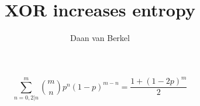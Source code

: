 \documentclass{article}
\title{XOR increases entropy}
\author{Daan van Berkel}
\begin{document}
  \maketitle
  \[
    \sum_{n=0,2|n}^{m}{\binom{m}{n}p^{n}(1-p)^{m-n}} = \frac{1+(1-2p)^{m}}{2}
  \]
\end{document}
